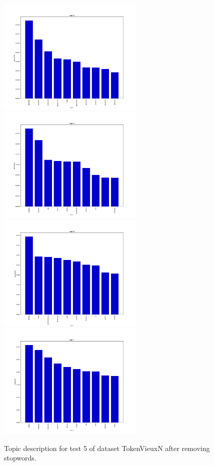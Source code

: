 \documentclass[10pt]{article} %
\begin{document}
	
\begin{figure}[H]
	\centering
	\includegraphics[width=7cm]{images/plots/test_5_no_stopwords_dataset_2/topic_4.png}
	\includegraphics[width=7cm]{images/plots/test_5_no_stopwords_dataset_2/topic_5.png}
		\includegraphics[width=7cm]{images/plots/test_5_no_stopwords_dataset_2/topic_6.png}
		\includegraphics[width=7cm]{images/plots/test_5_no_stopwords_dataset_2/topic_7.png}	
	\caption{Topic description for test 5 of dataset TokenVieuxN after removing stopwords.}
\end{figure}
	
\end{document}
